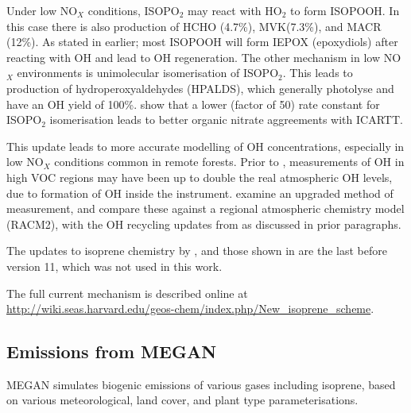     Under low NO$_X$ conditions, ISOPO$_2$ may react with HO$_2$ to form ISOPOOH.
    In this case there is also production of HCHO (4.7\%), MVK(7.3\%), and MACR (12\%).
    As stated in earlier; most ISOPOOH will form IEPOX (epoxydiols) after reacting with OH and lead to OH regeneration.
    The other mechanism in low NO$_X$ environments is unimolecular isomerisation of ISOPO$_2$.
    This leads to production of hydroperoxyaldehydes (HPALDS), which generally photolyse and have an OH yield of 100\%.
    \citet{Mao2013} show that a lower (factor of 50) rate constant for ISOPO$_2$ isomerisation leads to better organic nitrate aggreements with ICARTT. 
    
    This update leads to more accurate modelling of OH concentrations, especially in low NO$_X$ conditions common in remote forests.
    Prior to \citet{Mao2012}, measurements of OH in high VOC regions may have been up to double the real atmospheric OH levels, due to formation of OH inside the instrument.
    \citet{Mao2012} examine an upgraded method of measurement, and compare these against a regional atmospheric chemistry model (RACM2), with the OH recycling updates from \citet{Paulot2009b} as discussed in prior paragraphs.
    
    The updates to isoprene chemistry by \citet{Mao2013}, and those shown in \cite{Crounse2011,Crounse2012} are the last before version 11, which was not used in this work.
    
    The full current mechanism is described online at \url{http://wiki.seas.harvard.edu/geos-chem/index.php/New_isoprene_scheme}.

  \subsection{Emissions from MEGAN}
    \label{Model:GC_isop:MEGAN}
    MEGAN simulates biogenic emissions of various gases including isoprene, based on various meteorological, land cover, and plant type parameterisations.
    
